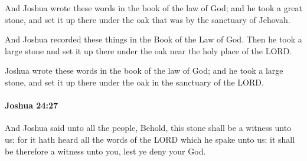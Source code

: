 			\begin{versebox}
					\item[BHS] 
					\item[ASV] And Joshua wrote these words in the book of the law of God; and he took a great stone, and set it up there under the oak that was by the sanctuary of Jehovah.
					\item[NIV] And Joshua recorded these things in the Book of the Law of God. Then he took a large stone and set it up there under the oak near the holy place of the LORD.
					\item[NRSV] Joshua wrote these words in the book of the law of God; and he took a large stone, and set it up there under the oak in the sanctuary of the LORD.
			\end{versebox}

		\paragraph{Joshua 24:27} %
			\label{JOSHUA-24-27}

			And Joshua said unto all the people, Behold, this stone shall be a witness unto us; for it hath heard all the words of the LORD which he spake unto us: it shall be therefore a witness unto you, lest ye deny your God.


